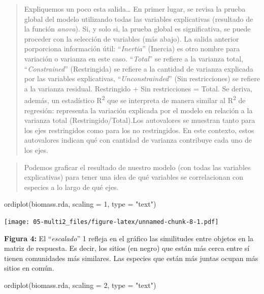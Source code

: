 \documentclass[
]{book}
\newenvironment{Shaded}{\begin{snugshade}}{\end{snugshade}}
\newcommand{\AttributeTok}[1]{\textcolor[rgb]{0.77,0.63,0.00}{#1}}
\newcommand{\DecValTok}[1]{\textcolor[rgb]{0.00,0.00,0.81}{#1}}
\newcommand{\FunctionTok}[1]{\textcolor[rgb]{0.00,0.00,0.00}{#1}}
\newcommand{\NormalTok}[1]{#1}
\newcommand{\StringTok}[1]{\textcolor[rgb]{0.31,0.60,0.02}{#1}}
\begin{document}
\begin{quote}
Expliquemos un poco esta salida\ldots{}
En primer lugar, se revisa la prueba global del modelo utilizando todas las variables explicativas (resultado de la función \emph{anova}). Si, y solo si, la prueba global es significativa, se puede proceder con la selección de variables (más abajo).
La salida anterior porporciona información útil: ``\emph{Inertia}'' (Inercia) es otro nombre para variación o varianza en este caso. ``\emph{Total}'' se refiere a la varianza total, ``\emph{Constrained}'' (Restringida) se refiere a la cantidad de varianza explicada por las variables explicativas, ``\emph{Unconstrainded}'' (Sin restricciones) se refiere a la varianza residual. Restringido + Sin restricciones = Total. Se deriva, además, un estadístico R\textsuperscript{2} que se interpreta de manera similar al R\textsuperscript{2} de regresión: representa la variación explicada por el modelo en relación a la varianza total (Restringido/Total).Los autovalores se muestran tanto para los ejes restringidos como para los no restringidos. En este contexto, estos autovalores indican qué con cantidad de varianza contribuye cada uno de los ejes.
\end{quote}

\begin{quote}
Podemos graficar el resultado de nuestro modelo (con todas las variables explicativas) para tener una idea de qué variables se correlacionan con especies a lo largo de qué ejes.
\end{quote}

\begin{Shaded}
\begin{Highlighting}[]
\FunctionTok{ordiplot}\NormalTok{(biomass.rda, }\AttributeTok{scaling =} \DecValTok{1}\NormalTok{, }\AttributeTok{type =} \StringTok{"text"}\NormalTok{)}
\end{Highlighting}
\end{Shaded}

\texttt{[image: 05-multi2\_files/figure-latex/unnamed-chunk-8-1.pdf]}

\textbf{Figura 4:} El ``\emph{escalado}'' 1 refleja en el gráfico las similitudes entre objetos en la matriz de respuesta. Es decir, los sitios (en negro) que están más cerca entre sí tienen comunidades más similares. Las especies que están más juntas ocupan más sitios en común.

\begin{Shaded}
\begin{Highlighting}[]
\FunctionTok{ordiplot}\NormalTok{(biomass.rda, }\AttributeTok{scaling =} \DecValTok{2}\NormalTok{, }\AttributeTok{type =} \StringTok{"text"}\NormalTok{)}
\end{Highlighting}
\end{Shaded}
\end{document}
